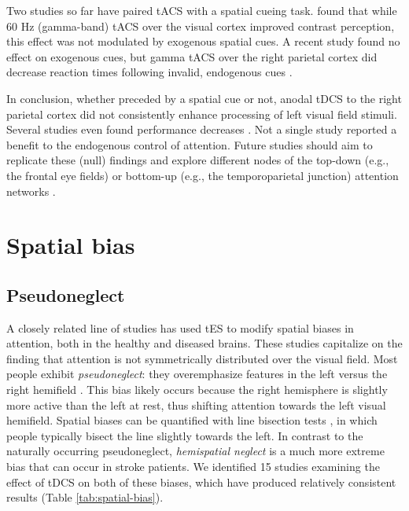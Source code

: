 \documentclass[11pt,english,]{memoir}
\begin{document}
Two studies so far have paired tACS with a spatial cueing task. \textcite{Laczo2012} found that while 60 Hz (gamma-band) tACS over the visual cortex improved contrast perception, this effect was not modulated by exogenous spatial cues. A recent study found no effect on exogenous cues, but gamma tACS over the right parietal cortex did decrease reaction times following invalid, endogenous cues \autocite{Hopfinger2016}.

In conclusion, whether preceded by a spatial cue or not, anodal tDCS to the right parietal cortex did not consistently enhance processing of left visual field stimuli. Several studies even found performance decreases \autocites{Filmer2015}{Learmonth2015}. Not a single study reported a benefit to the endogenous control of attention. Future studies should aim to replicate these (null) findings and explore different nodes of the top-down (e.g., the frontal eye fields) or bottom-up (e.g., the temporoparietal junction) attention networks \autocite{Corbetta2002}.

\hypertarget{spatial-bias}{%
\section{Spatial bias}\label{spatial-bias}}

\hypertarget{pseudoneglect}{%
\subsection{Pseudoneglect}\label{pseudoneglect}}

A closely related line of studies has used tES to modify spatial biases in attention, both in the healthy and diseased brains. These studies capitalize on the finding that attention is not symmetrically distributed over the visual field. Most people exhibit \emph{pseudoneglect}: they overemphasize features in the left versus the right hemifield \autocite{Jewell2000}. This bias likely occurs because the right hemisphere is slightly more active than the left at rest, thus shifting attention towards the left visual hemifield. Spatial biases can be quantified with line bisection tests \autocite{Bowers1980}, in which people typically bisect the line slightly towards the left. In contrast to the naturally occurring pseudoneglect, \emph{hemispatial neglect} is a much more extreme bias that can occur in stroke patients. We identified 15 studies examining the effect of tDCS on both of these biases, which have produced relatively consistent results (Table \ref{tab:spatial-bias}).
\end{document}
